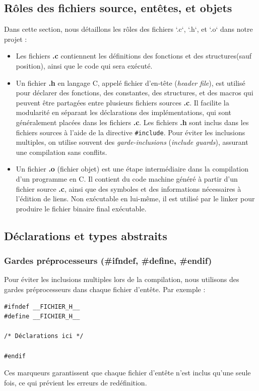 \documentclass[a4paper,12pt]{report}
\begin{document}
\subsection{Rôles des fichiers source, entêtes, et objets}
Dans cette section, nous détaillons les rôles des fichiers `.c`, `.h`, et `.o` dans notre projet :
\begin{itemize}
    \item Les fichiers \textbf{.c} contiennent les définitions des fonctions et des structures(sauf position), ainsi que le code qui sera exécuté.
    \item Un fichier \textbf{.h} en langage C, appelé fichier d'en-tête (\emph{header file}), est utilisé pour déclarer des fonctions, des constantes, des structures, et des macros qui peuvent être partagées entre plusieurs fichiers sources \textbf{.c}. Il facilite la modularité en séparant les déclarations des implémentations, qui sont généralement placées dans les fichiers \textbf{.c}. Les fichiers \textbf{.h} sont inclus dans les fichiers sources à l'aide de la directive \texttt{\#include}. Pour éviter les inclusions multiples, on utilise souvent des \emph{garde-inclusions} (\emph{include guards}), assurant une compilation sans conflits.

    \item Un fichier \textbf{.o} (fichier objet) est une étape intermédiaire dans la compilation d’un programme en C. Il contient du code machine généré à partir d’un fichier source \textbf{.c}, ainsi que des symboles et des informations nécessaires à l’édition de liens. Non exécutable en lui-même, il est utilisé par le linker pour produire le fichier binaire final exécutable.
\end{itemize}

\subsection{Déclarations et types abstraits}
\subsubsection*{Gardes préprocesseurs (\#ifndef, \#define, \#endif)}
Pour éviter les inclusions multiples lors de la compilation, nous utilisons des gardes préprocesseurs dans chaque fichier d'entête. Par exemple :
\begin{verbatim}
#ifndef __FICHIER_H__
#define __FICHIER_H__

/* Déclarations ici */

#endif
\end{verbatim}
Ces marqueurs garantissent que chaque fichier d'entête n'est inclus qu'une seule fois, ce qui prévient les erreurs de redéfinition.
\end{document}

